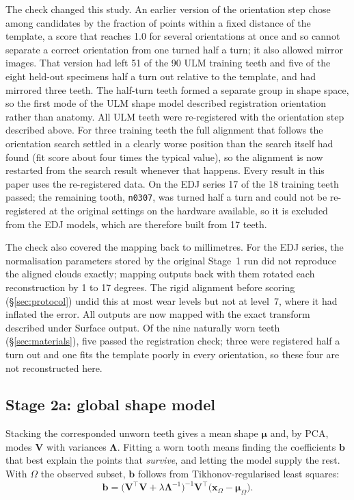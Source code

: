 \documentclass[10pt,a4paper,twocolumn]{article}
\newcommand{\code}[1]{\texttt{#1}}
\begin{document}
The check changed this study. An earlier version of the orientation step chose
among candidates by the fraction of points within a fixed distance of the
template, a score that reaches 1.0 for several orientations at once and so
cannot separate a correct orientation from one turned half a turn; it also
allowed mirror images. That version had left 51 of the 90 ULM training teeth and
five of the eight held-out specimens half a turn out relative to the template,
and had mirrored three teeth. The half-turn teeth formed a separate group in
shape space, so the first mode of the ULM shape model described registration
orientation rather than anatomy. All ULM teeth were re-registered with the
orientation step described above. For three training teeth the full alignment
that follows the orientation search settled in a clearly worse position than the
search itself had found (fit score about four times the typical value), so the
alignment is now restarted from the search result whenever that happens. Every
result in this paper uses the re-registered data. On the EDJ series 17 of the 18 training teeth passed; the
remaining tooth, \code{n0307}, was turned half a turn and could not be
re-registered at the original settings on the hardware available, so it is
excluded from the EDJ models, which are therefore built from 17 teeth.

The check also covered the mapping back to millimetres. For the EDJ series, the
normalisation parameters stored by the original Stage~1 run did not reproduce the
aligned clouds exactly; mapping outputs back with them rotated each reconstruction
by 1 to 17 degrees. The rigid alignment before scoring (\S\ref{sec:protocol})
undid this at most wear levels but not at level~7, where it had inflated the error.
All outputs are now mapped with the exact transform described under Surface output.
Of the nine naturally worn teeth (\S\ref{sec:materials}), five passed the
registration check; three were registered half a turn out and one fits the
template poorly in every orientation, so these four are not reconstructed here.

\subsection{Stage 2a: global shape model}
\label{sec:global}

Stacking the corresponded unworn teeth gives a mean shape $\bm{\mu}$ and, by PCA,
modes $\mathbf{V}$ with variances $\bm{\Lambda}$. Fitting a worn tooth means
finding the coefficients $\mathbf{b}$ that best explain the points that
\emph{survive}, and letting the model supply the rest. With $\Omega$ the observed
subset, $\mathbf{b}$ follows from Tikhonov-regularised least squares:
\begin{equation}
  \mathbf{b} =
  \bigl(\mathbf{V}^{\!\top}\mathbf{V} + \lambda\bm{\Lambda}^{-1}\bigr)^{-1}
  \mathbf{V}^{\!\top}\bigl(\mathbf{x}_\Omega - \bm{\mu}_\Omega\bigr).
  \label{eq:fit}
\end{equation}
\end{document}
